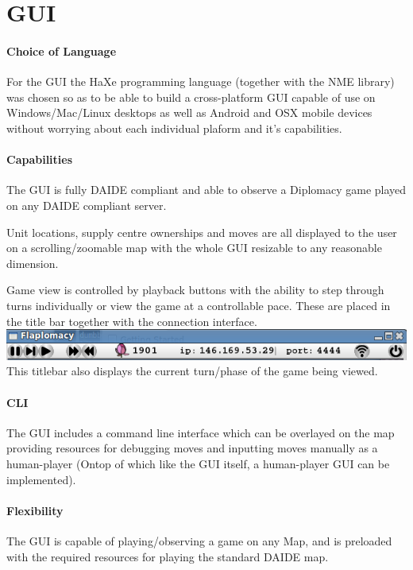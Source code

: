\documentclass[pdftex,12pt,a4paper]{report}
\begin{document}
\section{GUI}

\paragraph{Choice of Language}
For the GUI the HaXe programming language (together with the NME library) was chosen so as to be able to build a cross-platform GUI capable of use on Windows/Mac/Linux desktops as well as Android and OSX mobile devices without worrying about each individual plaform and it's capabilities.

\paragraph{Capabilities}
The GUI is fully DAIDE compliant and able to observe a Diplomacy game played on any DAIDE compliant server.

Unit locations, supply centre ownerships and moves are all displayed to the user on a scrolling/zoomable map with the whole GUI resizable to any reasonable dimension.

Game view is controlled by playback buttons with the ability to step through turns individually or view the game at a controllable pace. These are placed in the title bar together with the connection interface. \\[0.5cm]
\includegraphics[scale=0.5]{./screenshots/Titlebar.png} \\[0.5cm]
This titlebar also displays the current turn/phase of the game being viewed.

\paragraph{CLI}
The GUI includes a command line interface which can be overlayed on the map providing resources for debugging moves and inputting moves manually as a human-player (Ontop of which like the GUI itself, a human-player GUI can be implemented).

\paragraph{Flexibility}
The GUI is capable of playing/observing a game on any Map, and is preloaded with the required resources for playing the standard DAIDE map.
\end{document}
